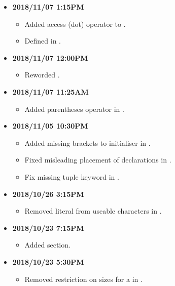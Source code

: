 \documentclass[../gazprea.tex]{subfiles}
\begin{document}
\begin{itemize}
  \item
    \textbf{2018/11/07 1:15PM}
    \begin{itemize}
      \item Added access (dot) operator to  .
      \item Defined  in  .
    \end{itemize}
  \item
    \textbf{2018/11/07 12:00PM}
    \begin{itemize}
      \item Reworded .
    \end{itemize}
  \item
    \textbf{2018/11/07 11:25AM}
    \begin{itemize}
      \item Added parentheses operator in  .
    \end{itemize}
  \item
    \textbf{2018/11/05 10:30PM}
    \begin{itemize}
      \item Added missing brackets to  initialiser in .
      \item Fixed misleading placement of declarations in .
      \item Fix missing tuple keyword in .
    \end{itemize}
  \item
    \textbf{2018/10/26 3:15PM}
    \begin{itemize}
      \item Removed literal \code{\\n} from useable characters in .
    \end{itemize}
  \item
    \textbf{2018/10/23 7:15PM}
    \begin{itemize}
      \item Added  section.
    \end{itemize}
  \item
    \textbf{2018/10/23 5:30PM}
    \begin{itemize}
      \item Removed restriction on sizes for a  in .

\end{itemize}
\end{itemize}
\end{document}
